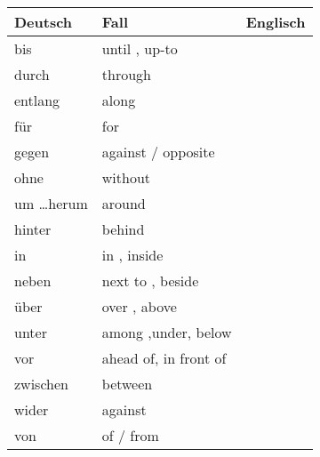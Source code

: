 \documentclass[a4paper,twocolumn,10pt]{article}
\newcommand{\tabularxtable}[3]
{

	\vspace{0.5cm}
	\nolinenumbers

	\begin{tabularx}{#1}{#2}
		#3
	\end{tabularx}

	\linenumbers
	\vspace{0.5cm}
}
\begin{document}
\tabularxtable
{0.99\linewidth}
{XXX}
{

	Deutsch & Fall & Englisch  \\
		\midrule


		\cellcolor{white} bis &
		\cellcolor{white} until , up-to \\

		\cellcolor{white} durch &
		\cellcolor{white} through \\

		\cellcolor{white} entlang &
		\cellcolor{white} along \\

		\cellcolor{white} für &
		\cellcolor{white} for \\

		\cellcolor{white} gegen &
		\cellcolor{white} against / opposite \\

		\cellcolor{white} ohne &
		\cellcolor{white}  without\\

		\cellcolor{white} um \ldots herum &
		\cellcolor{white}  around\\

		\cellcolor{white} hinter &
		\cellcolor{white}  behind\\

		\cellcolor{white} in &
		\cellcolor{white} in , inside \\

		\cellcolor{white} neben &
		\cellcolor{white} next to , beside \\

		\cellcolor{white} über &
		\cellcolor{white} over , above \\

		\cellcolor{white} unter &
		\cellcolor{white} among ,under, below \\


		\cellcolor{white} vor &
		\cellcolor{white} ahead of, in front of \\

	\cellcolor{white} zwischen &
		\cellcolor{white}  between\\



		\cellcolor{white} wider &
		\cellcolor{white} against \\

		\midrule


		\cellcolor{white} von &
		\cellcolor{white} of / from \\

}
\end{document}
